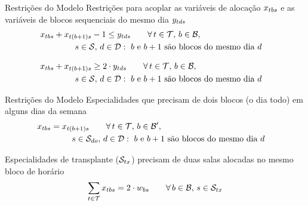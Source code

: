 \documentclass[handout]{beamer}
\begin{document}
\begin{frame}{Restrições do Modelo}
    Restrições para acoplar as variáveis de alocação $x_{tbs}$ e as variáveis de blocos sequenciais do mesmo dia $y_{tds}$
    \begin{align}
    \label{eq:m2-8}
        &x_{tbs} + x_{t(b+1)s} - 1 \leq y_{tds} \hspace{2em} \forall\, t \in \mathcal{T},\, b \in \mathcal{B},&\\
        & \hspace{4em}\,s \in \mathcal{S},\, d \in \mathcal{D} : \text{ $b$ e $b+1$ são blocos do mesmo dia $d$}&\nonumber
    \end{align}

    \begin{align}
    \label{eq:m2-9}
        &x_{tbs} + x_{t(b+1)s} \geq 2 \cdot y_{tds} \hspace{2em} \forall\, t \in \mathcal{T},\, b \in \mathcal{B},&\\
        &\hspace{4em}\,s \in \mathcal{S},\, d \in \mathcal{D} : \text{ $b$ e $b+1$ são blocos do mesmo dia $d$}&\nonumber
    \end{align}
\end{frame}


\begin{frame}{Restrições do Modelo}
    Especialidades que precisam de dois blocos (o dia todo) em alguns dias da semana
    \begin{align}
    \label{eq:m2-10}
        &x_{tbs} = x_{t(b+1)s} \hspace{2em} \forall\, t \in \mathcal{T},\, b \in \mathcal{B'},&\\
        &\hspace{4em}\,s \in \mathcal{S}_{do},\, d \in \mathcal{D} : \text{ $b$ e $b+1$ são blocos do mesmo dia $d$}&\nonumber
    \end{align}
    \vspace{2em}

    Especialidades de transplante ($\mathcal{S}_{tx}$) precisam de duas salas alocadas no mesmo bloco de horário
    \begin{equation}
    \label{eq:m2-11}
        \sum_{t \in \mathcal{T}} x_{tbs} = 2 \cdot w_{bs} \hspace{2em} \forall\, b \in \mathcal{B},\, s \in \mathcal{S}_{tx}
    \end{equation}
\end{frame}
\end{document}
